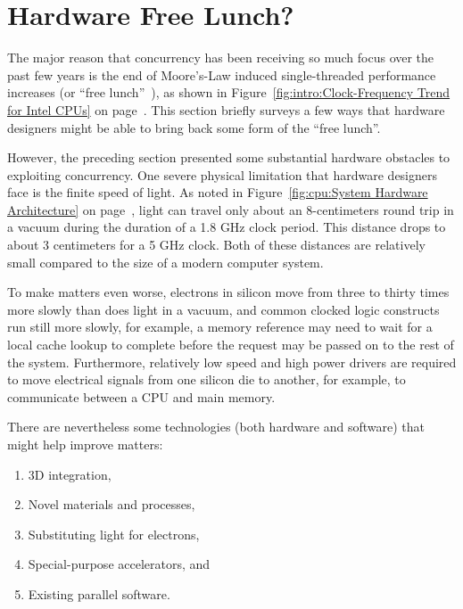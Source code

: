 
\section{Hardware Free Lunch?}
\label{sec:cpu:Hardware Free Lunch?}

The major reason that concurrency has been receiving so much focus over
the past few years is the end of Moore's-Law induced single-threaded
performance increases
(or ``free lunch''~\cite{HerbSutter2008EffectiveConcurrency}),
as shown in
Figure~\ref{fig:intro:Clock-Frequency Trend for Intel CPUs} on
page~\pageref{fig:intro:Clock-Frequency Trend for Intel CPUs}.
This section briefly surveys a few ways that hardware designers
might be able to bring back some form of the ``free lunch''.

However, the preceding section presented some substantial hardware
obstacles to exploiting concurrency.
One severe physical limitation that hardware designers face is the
finite speed of light.
As noted in
Figure~\ref{fig:cpu:System Hardware Architecture} on
page~\pageref{fig:cpu:System Hardware Architecture},
light can travel only about an 8-centimeters round trip
in a vacuum during the duration of a 1.8 GHz clock period.
This distance drops to about 3 centimeters for a 5 GHz clock.
Both of these distances are relatively small compared to the size
of a modern computer system.

To make matters even worse, electrons in silicon move from three to
thirty times more slowly than does light in a vacuum, and common
clocked logic constructs run still more slowly, for example, a
memory reference may need to wait for a local cache lookup to complete
before the request may be passed on to the rest of the system.
Furthermore, relatively low speed and high power drivers are required
to move electrical signals from one silicon die to another, for example,
to communicate between a CPU and main memory.

There are nevertheless some technologies (both hardware and software)
that might help improve matters:

\begin{enumerate}
\item	3D integration,
\item	Novel materials and processes,
\item	Substituting light for electrons,
\item	Special-purpose accelerators, and
\item	Existing parallel software.
\end{enumerate}

